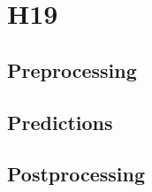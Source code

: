 \section{H19}
    \subsection{Preprocessing}
    \subsection{Predictions}
    \subsection{Postprocessing}
